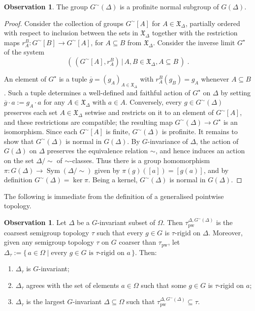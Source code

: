 \documentclass{article}
\theoremstyle{remark}
\theoremstyle{definition}
\newtheorem{observation}[theorem]{Observation}
\newcommand{\pw}[0]{\tau_{\mathrm{pw}}}
\newcommand{\X}[0]{\mathfrak{X}}
\DeclareMathOperator{\Sym}{Sym}
\newcommand{\gc}[0]{G^{\sim}}
\begin{document}
{{{{{\begin{observation}\label{ob:gcdelta} {The group $\gc(\Delta)$ is a profinite normal subgroup of $G(\Delta)$.}
\end{observation}
\begin{proof}
    {Consider the collection of groups $\gc[A]$ for $A\in\X_{\Delta}$, partially ordered with respect to inclusion between the sets in $\X_{\Delta}$ together with the restriction maps $r_{A}^{B}:\gc[B]\to \gc[A]$, for $A\subseteq B$ from $\X_{\Delta}$. Consider the inverse limit $G^\star$ of the system}
       \[(\,(\gc[A],{r_{A}^{B}})\,|\,A,B\in\X_{\Delta},A\subseteq B\,)\; .
   \]

   { An element of $G^{\star}$ is a tuple $\overline{g}=(g_{A})_{A\in\X_{\Delta}}$ with
  $r^{B}_{A}(g_{B})=g_{A}$ whenever $A\subseteq B$. Such a tuple determines a well-defined
  and faithful action of $G^{\star}$ on $\Delta$ by setting
  $\overline{g}\cdot a:=g_{A}\cdot a$ for any $A\in\X_{\Delta}$ with $a\in A$. Conversely, every
  $g\in\gc(\Delta)$ preserves each set $A\in\X_{\Delta}$ setwise and restricts on it to an
  element of $\gc[A]$, and these restrictions are compatible; the resulting map
  $\gc(\Delta)\to G^{\star}$ is an isomorphism. Since each $\gc[A]$ is finite,
  $\gc(\Delta)$ is profinite.
  It remains to show that $\gc(\Delta)$ is normal in $G(\Delta)$. By $G$-invariance of
  $\Delta$, the action of $G(\Delta)$ on $\Delta$ preserves the equivalence relation $\sim$,
  and hence induces an action on the set $\Delta/{\sim}$ of $\sim$-classes. Thus there is a
  group homomorphism $\pi\colon G(\Delta)\to\Sym(\Delta/{\sim})$ given by
  $\pi(g)([a])=[g(a)]$, and by definition $\gc(\Delta)=\ker\pi$. Being a kernel,
  $\gc(\Delta)$ is normal in $G(\Delta)$.}
\end{proof}



The following is immediate from the definition of a generalised pointwise topology.
   
\begin{observation} \label{largest Delta}
    Let $\Delta$ be a $G$-invariant {subset of $\Omega$}. Then $\pw^{\Delta,{\gc(\Delta)}}$ is %
    the coarsest  semigroup topology $\tau$ such that every $g\in G$ is $\tau$-rigid on $\Delta$. Moreover, given any semigroup topology $\tau$ on $G$ coarser than $\pw$, let $\Delta_{\tau}:=  \{\, a \in \Omega \mid \text{every } g \in G \text{ is }
  \tau\text{-rigid on } a \,\} $. %
  Then: 
    \begin{enumerate}[label=(\roman*)]
     \item \label{Delta c} $\Delta_{\tau}$ is $G$-invariant;
         \item \label{Delta b} $\Delta_{\tau}$ agrees with the set of elements $a\in\Omega$ such that some $g\in G$ is $\tau$-rigid on $a$;
     \item \label{Delta a} $\Delta_{\tau}$ is the largest {$G$-invariant} $\Delta\subseteq \Omega$ 
     such that $\pw^{\Delta, {\gc(\Delta)}}\subseteq \tau$.


\end{enumerate}
\end{observation}}}}}}
\end{document}
